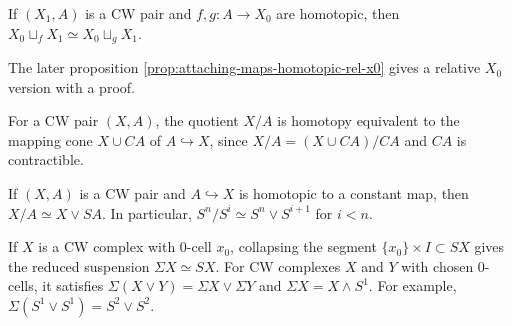 \begin{proposition}
\label{prop:attaching-homotopic-maps-preview}



If $(X_1,A)$ is a CW pair and $f,g:A\to X_0$ are homotopic, then
$X_0\sqcup_fX_1\simeq X_0\sqcup_gX_1$.
\end{proposition}

\begin{remark}
\label{rem:attaching-homotopic-maps-sharper-version}

The later proposition \cref{prop:attaching-maps-homotopic-rel-x0} gives a relative
$X_0$ version with a proof.
\end{remark}

\begin{example}
\label{ex:quotient-contractible-subcomplex-mapping-cone}

For a CW pair $(X,A)$, the quotient $X/A$ is homotopy equivalent to the mapping cone
$X\cup CA$ of $A\hookrightarrow X$, since
$X/A=(X\cup CA)/CA$ and $CA$ is contractible.
\end{example}

\begin{example}
\label{ex:quotient-by-contractible-in-x}

If $(X,A)$ is a CW pair and $A\hookrightarrow X$ is homotopic to a constant map, then
$X/A\simeq X\vee SA$. In particular, $S^n/S^i\simeq S^n\vee S^{i+1}$ for $i<n$.
\end{example}

\begin{example}
\label{ex:reduced-suspension}

If $X$ is a CW complex with 0-cell $x_0$, collapsing the segment
$\{x_0\}\times I\subset SX$ gives the reduced suspension $\Sigma X\simeq SX$.
For CW complexes $X$ and $Y$ with chosen $0$-cells, it satisfies
$\Sigma(X\vee Y)=\Sigma X\vee\Sigma Y$ and $\Sigma X=X\wedge S^1$.
For example, $\Sigma(S^1\vee S^1)=S^2\vee S^2$.
\end{example}

